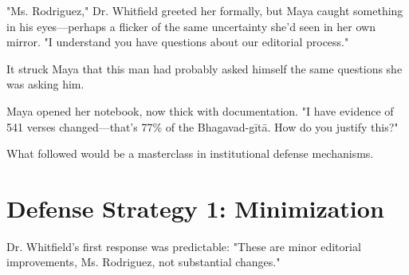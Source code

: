 \documentclass[11pt,twoside]{book}
\begin{document}
"Ms. Rodriguez," Dr. Whitfield greeted her formally, but Maya caught something in his eyes—perhaps a flicker of the same uncertainty she'd seen in her own mirror. "I understand you have questions about our editorial process."

It struck Maya that this man had probably asked himself the same questions she was asking him.

Maya opened her notebook, now thick with documentation. "I have evidence of 541 verses changed—that's 77\% of the Bhagavad-gītā. How do you justify this?"

What followed would be a masterclass in institutional defense mechanisms.
\section*{Defense Strategy 1: Minimization}
\label{sec:org2b885af}

Dr. Whitfield's first response was predictable: "These are minor editorial improvements, Ms. Rodriguez, not substantial changes."
\end{document}
